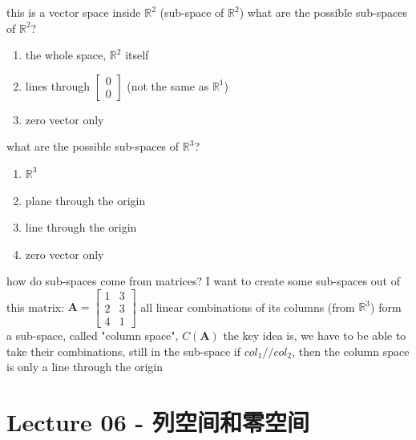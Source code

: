 \documentclass[12pt, a4paper]{article}
\begin{document}
{\begin{center}
\end{center}
this is a vector space inside $\mathbb{R}^2$ (sub-space of $\mathbb{R}^2$)
\vspace{14pt}
\newline
what are the possible sub-spaces of $\mathbb{R}^2$?
\begin{enumerate}
	\item the whole space, $\mathbb{R}^2$ itself
	\item lines through 
		$\begin{bmatrix}
			0 \\
			0
		\end{bmatrix}$
	 (not the same as $\mathbb{R}^1$)
	\item zero vector only
\end{enumerate}
what are the possible sub-spaces of $\mathbb{R}^3$?
\begin{enumerate}
	\item $\mathbb{R}^3$
	\item plane through the origin
	\item line through the origin
	\item zero vector only
\end{enumerate}
\vspace{14pt}
how do sub-spaces come from matrices?
\vspace{14pt}
\newline
I want to create some sub-spaces out of this matrix: 
\begin{math}
	{\mathbf{A}} = 
	\begin{bmatrix}
		1 & 3 \\
		2 & 3 \\
		4 & 1
	\end{bmatrix}
\end{math}
\newline
all linear combinations of its columns (from $\mathbb{R}^3$) form a sub-space, called "column space", $C(\mathbf{A})$
\vspace{14pt}
\newline
the key idea is, we have to be able to take their combinations, still in the sub-space
\vspace{14pt}
\newline
if $col_1 // col_2$, then the column space is only a line through the origin

\newpage
\section{Lecture 06 - 列空间和零空间}
\pagestyle{fancy}
\lhead{}
\rhead{}

}
\end{document}
